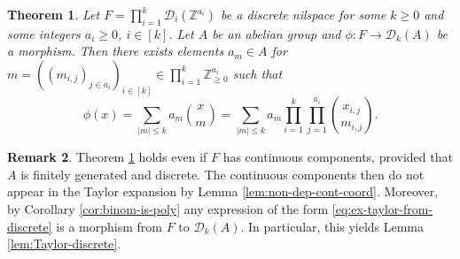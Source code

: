 \documentclass[a4paper,12pt,reqno]{amsart}
\newtheorem{theorem}{Theorem}[section]
\theoremstyle{definition}
\newtheorem{remark}[theorem]{Remark}
\def\to{\rightarrow}
\newcommand{\mc}{\mathcal}
\newcommand{\mb}{\mathbb}
\begin{document}
\begin{theorem}\label{thm:Taylor-discrete-app}
Let $F=\prod_{i=1}^k \mc{D}_i(\mb{Z}^{a_i})$ be a discrete nilspace for some $k\ge 0$ and some integers $a_i\ge 0$, $i\in[k]$. Let $A$ be an abelian group and $\phi:F\to \mc{D}_k(A)$ be a morphism. Then there exists elements $a_m\in A$ for $m= ((m_{i,j})_{j\in a_i})_{i\in[k]} \in \prod_{i=1}^k \mb{Z}_{\ge 0}^{a_i}$ such that
\begin{equation}\label{eq:ex-taylor-from-discrete}
\phi(x)=\sum_{|m|\le k}a_m \binom{x}{m} =\sum_{|m|\le k}a_m \prod_{i=1}^k\prod_{j=1}^{a_i} \binom{x_{i,j}}{m_{i,j}}.
\end{equation}
\end{theorem}
\begin{remark}\label{rem:Taylor-discrete-app}
Theorem \ref{thm:Taylor-discrete-app} holds even if $F$ has continuous components, provided that $A$ is finitely generated and discrete. The continuous components then do not appear in the Taylor expansion by Lemma \ref{lem:non-dep-cont-coord}. Moreover, by Corollary \ref{cor:binom-is-poly} any expression of the form \eqref{eq:ex-taylor-from-discrete} is a morphism from $F$ to $\mc{D}_k(A)$. In particular, this yields Lemma \ref{lem:Taylor-discrete}.
\end{remark}
\end{document}
